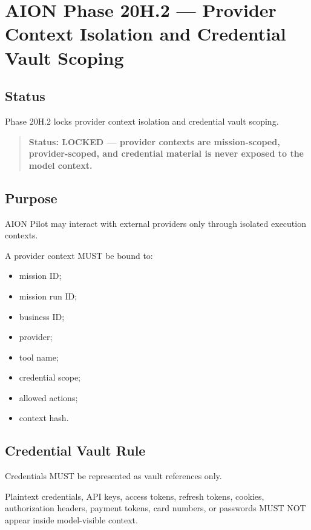 \section{AION Phase 20H.2 --- Provider Context Isolation and Credential Vault Scoping}
\label{sec:aion-phase20h2-provider-context-isolation-credential-vault-scoping}

\subsection{Status}

Phase 20H.2 locks provider context isolation and credential vault scoping.

\begin{quote}
\textbf{Status: LOCKED --- provider contexts are mission-scoped, provider-scoped, and credential material is never exposed to the model context.}
\end{quote}

\subsection{Purpose}

AION Pilot may interact with external providers only through isolated execution contexts.

A provider context MUST be bound to:

\begin{itemize}
  \item mission ID;
  \item mission run ID;
  \item business ID;
  \item provider;
  \item tool name;
  \item credential scope;
  \item allowed actions;
  \item context hash.
\end{itemize}

\subsection{Credential Vault Rule}

Credentials MUST be represented as vault references only.

Plaintext credentials, API keys, access tokens, refresh tokens, cookies, authorization headers, payment tokens, card numbers, or passwords MUST NOT appear inside model-visible context.

